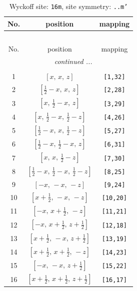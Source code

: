 \documentclass[fleqn,8pt]{jsarticle}
\begin{document}
\renewcommand{\arraystretch}{1.2}
\begin{longtable}{ccc}
\caption{Wyckoff site: {\tt 16m}, site symmetry: {\tt ..m'}}
 \\
 \hline \hline
No. & position & mapping \\ \hline \endfirsthead

\multicolumn{2}{l}{\tablename\ \thetable{}} \\
 \hline \hline
No. & position & mapping \\ \hline \endhead

 \hline \hline
\multicolumn{2}{r}{\footnotesize\it continued ...} \\ \endfoot

 \hline \hline
\multicolumn{2}{r}{} \\ \endlastfoot

1 & $\left[ x,\, x,\, z \right]$ & {\tt [1,32]} \\ \hline
2 & $\left[ \frac{1}{2} - x,\, x,\, z \right]$ & {\tt [2,28]} \\ \hline
3 & $\left[ x,\, \frac{1}{2} - x,\, z \right]$ & {\tt [3,29]} \\ \hline
4 & $\left[ x,\, \frac{1}{2} - x,\, \frac{1}{2} - z \right]$ & {\tt [4,26]} \\ \hline
5 & $\left[ \frac{1}{2} - x,\, x,\, \frac{1}{2} - z \right]$ & {\tt [5,27]} \\ \hline
6 & $\left[ \frac{1}{2} - x,\, \frac{1}{2} - x,\, z \right]$ & {\tt [6,31]} \\ \hline
7 & $\left[ x,\, x,\, \frac{1}{2} - z \right]$ & {\tt [7,30]} \\ \hline
8 & $\left[ \frac{1}{2} - x,\, \frac{1}{2} - x,\, \frac{1}{2} - z \right]$ & {\tt [8,25]} \\ \hline
9 & $\left[ - x,\, - x,\, - z \right]$ & {\tt [9,24]} \\ \hline
10 & $\left[ x + \frac{1}{2},\, - x,\, - z \right]$ & {\tt [10,20]} \\ \hline
11 & $\left[ - x,\, x + \frac{1}{2},\, - z \right]$ & {\tt [11,21]} \\ \hline
12 & $\left[ - x,\, x + \frac{1}{2},\, z + \frac{1}{2} \right]$ & {\tt [12,18]} \\ \hline
13 & $\left[ x + \frac{1}{2},\, - x,\, z + \frac{1}{2} \right]$ & {\tt [13,19]} \\ \hline
14 & $\left[ x + \frac{1}{2},\, x + \frac{1}{2},\, - z \right]$ & {\tt [14,23]} \\ \hline
15 & $\left[ - x,\, - x,\, z + \frac{1}{2} \right]$ & {\tt [15,22]} \\ \hline
16 & $\left[ x + \frac{1}{2},\, x + \frac{1}{2},\, z + \frac{1}{2} \right]$ & {\tt [16,17]} \\
\end{longtable}
\end{document}
